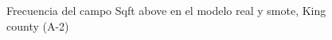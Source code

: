 \begin{figure}[H]
    \centering
    
    \caption{Frecuencia del campo Sqft above en el modelo real y smote, King county (A-2)}
    \label{frecuency-smote-sqft above}
\end{figure}